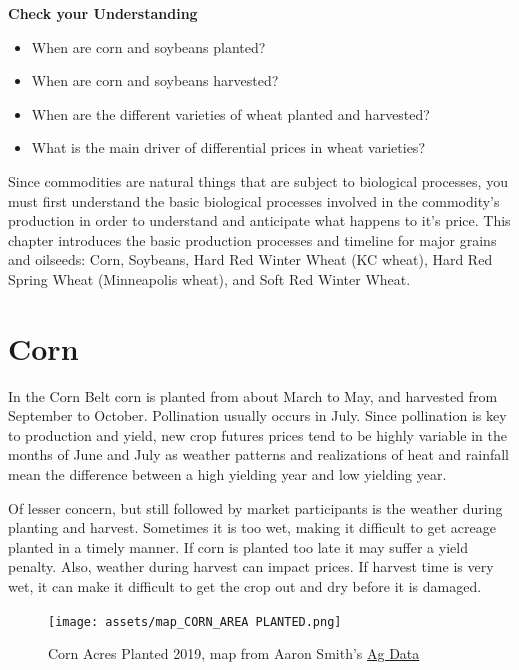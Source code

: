 \documentclass[
  letterpaper,
  DIV=11,
  numbers=noendperiod]{scrreprt}
\providecommand{\tightlist}{%
  \setlength{\itemsep}{0pt}\setlength{\parskip}{0pt}}\usepackage{longtable,booktabs,array}
\begin{document}
\textbf{Check your Understanding}

\begin{itemize}
\tightlist
\item
  When are corn and soybeans planted?
\item
  When are corn and soybeans harvested?
\item
  When are the different varieties of wheat planted and harvested?
\item
  What is the main driver of differential prices in wheat varieties?
\end{itemize}

Since commodities are natural things that are subject to biological
processes, you must first understand the basic biological processes
involved in the commodity's production in order to understand and
anticipate what happens to it's price. This chapter introduces the basic
production processes and timeline for major grains and oilseeds: Corn,
Soybeans, Hard Red Winter Wheat (KC wheat), Hard Red Spring Wheat
(Minneapolis wheat), and Soft Red Winter Wheat.

\section{Corn}\label{corn}

In the Corn Belt corn is planted from about March to May, and harvested
from September to October. Pollination usually occurs in July. Since
pollination is key to production and yield, new crop futures prices tend
to be highly variable in the months of June and July as weather patterns
and realizations of heat and rainfall mean the difference between a high
yielding year and low yielding year.

Of lesser concern, but still followed by market participants is the
weather during planting and harvest. Sometimes it is too wet, making it
difficult to get acreage planted in a timely manner. If corn is planted
too late it may suffer a yield penalty. Also, weather during harvest can
impact prices. If harvest time is very wet, it can make it difficult to
get the crop out and dry before it is damaged.

\begin{figure}[H]

{\centering \texttt{[image: assets/map\_CORN\_AREA PLANTED.png]}

}

\caption{Corn Acres Planted 2019, map from Aaron Smith's
\href{https://asmith.ucdavis.edu/data/us-crops}{Ag Data}}

\end{figure}%
\end{document}
